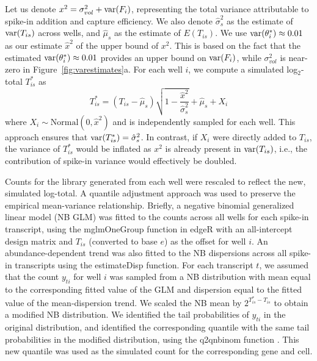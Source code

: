 \documentclass{article}
\begin{document}
Let us denote $x^2 = \sigma^2_{vol} + \mbox{var}(F_i)$, representing the total variance attributable to spike-in addition and capture efficiency.
We also denote $\hat\sigma^2_s$ as the estimate of $\mbox{var}(T_{is})$ across wells, and $\hat\mu_s$ as the estimate of $E(T_{is})$.
We use $\mbox{var}(\theta^*_i) \approx 0.01$ as our estimate $\hat{x}^2$ of the upper bound of $x^2$.
This is based on the fact that the estimated $\mbox{var}(\theta^*_i)\approx 0.01$ provides an upper bound on $\mbox{var}(F_i)$, while $\sigma^2_{vol}$ is near-zero in Figure~\ref{fig:varestimates}a.
For each well $i$, we compute a simulated log$_2$-total $T^*_{is}$ as
\[
    T^*_{is} = (T_{is} - \hat\mu_s)\sqrt{1-\frac{ \hat{x}^2}{\hat\sigma^2_s}} + \hat\mu_s + X_i
\]
where $X_i \sim \mbox{Normal}(0, \hat{x}^2)$ and is independently sampled for each well.
This approach ensures that $\mbox{var}(T^*_{is}) = \hat\sigma^2_s$.
In contrast, if $X_i$ were directly added to $T_{is}$, the variance of $T^*_{is}$ would be inflated as $x^2$ is already present in $\mbox{var}(T_{is})$, i.e., the contribution of spike-in variance would effectively be doubled.

Counts for the library generated from each well were rescaled to reflect the new, simulated log-total.
A quantile adjustment approach was used to preserve the empirical mean-variance relationship.
Briefly, a negative binomial generalized linear model (NB GLM) was fitted to the counts across all wells for each spike-in transcript, using the mglmOneGroup function in edgeR \cite{mccarthy2012differential, robinson2010edgeR} with an all-intercept design matrix and $T_{is}$ (converted to base $e$) as the offset for well $i$.
An abundance-dependent trend was also fitted to the NB dispersions across all spike-in transcripts using the estimateDisp function.
For each transcript $t$, we assumed that the count $y_{ti}$ for well $i$ was sampled from a NB distribution with mean equal to the corresponding fitted value of the GLM and dispersion equal to the fitted value of the mean-dispersion trend.
We scaled the NB mean by $2^{T^*_{is} - T_{is}}$ to obtain a modified NB distribution.
We identified the tail probabilities of $y_{ti}$ in the original distribution, and identified the corresponding quantile with the same tail probabilities in the modified distribution, using the q2qnbinom function \cite{robinson2008small}.
This new quantile was used as the simulated count for the corresponding gene and cell.

\end{document}
